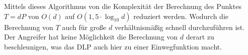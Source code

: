 Mittels dieses Algorithmus von die Komplexität der Berechnung des Punktes $T = dP$ von $O(d)$ auf $O(1,5 \cdot \log_{10}d)$ reduziert werden. Wodurch die Berechnung von $T$ auch für große $d$ verhältnismäßig schnell durchzuführen ist. Der Angreifer hat keine Möglichkeit die Berechnung von $d$ derart zu beschleunigen, was das DLP auch hier zu einer Einwegfunktion macht.\cite[280-284]{Paar.2016}




































